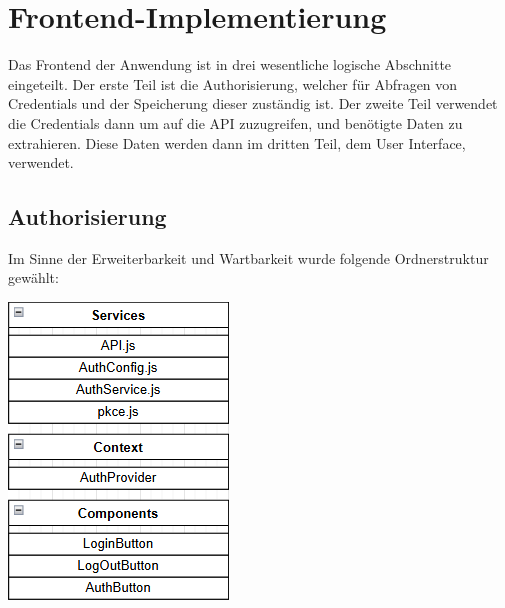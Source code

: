 \section{Frontend-Implementierung}
Das Frontend der Anwendung ist in drei wesentliche logische Abschnitte eingeteilt. Der erste Teil ist die Authorisierung, welcher für Abfragen von 
Credentials und der Speicherung dieser zuständig ist. Der zweite Teil verwendet die Credentials dann um auf die API zuzugreifen, und benötigte 
Daten zu extrahieren. Diese Daten werden dann im dritten Teil, dem User Interface, verwendet. 
\subsection{Authorisierung}
Im Sinne der Erweiterbarkeit und Wartbarkeit wurde folgende Ordnerstruktur gewählt:\break
\begin{center}
    \includegraphics[width=\linewidth]{./img/fileStructure.png}
\end{center}


